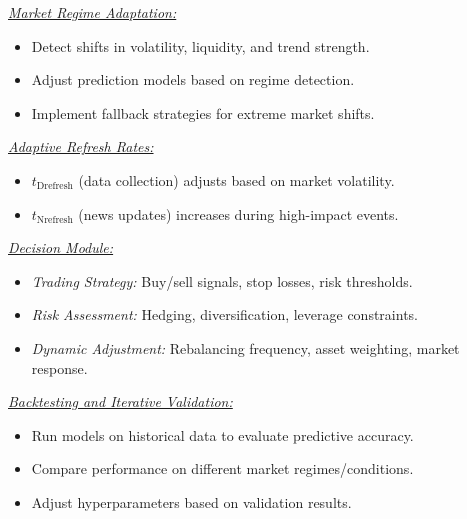 \noindent \underline{\textit{Market Regime Adaptation:}}
\begin{itemize}[leftmargin=1.5em, topsep=-.1em, parsep=-.1em, label=*]
   \item Detect shifts in volatility, liquidity, and trend strength.
   \item Adjust prediction models based on regime detection.
   \item Implement fallback strategies for extreme market shifts.
\end{itemize}

\noindent \underline{\textit{Adaptive Refresh Rates:}}
\begin{itemize}[leftmargin=1.5em, topsep=-.1em, parsep=-.1em, label=*]
   \item \(t_{\text{Drefresh}}\) (data collection) adjusts based on market volatility.
   \item \(t_{\text{Nrefresh}}\) (news updates) increases during high-impact events.
\end{itemize}

\noindent \underline{\textit{Decision Module:}}
\begin{itemize}[leftmargin=1.5em, topsep=-.1em, parsep=-.1em, label=*]
   \item \textit{Trading Strategy:} Buy/sell signals, stop losses, risk thresholds.
   \item \textit{Risk Assessment:} Hedging, diversification, leverage constraints.
   \item \textit{Dynamic Adjustment:} Rebalancing frequency, asset weighting, market response.
\end{itemize}

\noindent \underline{\textit{Backtesting and Iterative Validation:}}
\begin{itemize}[leftmargin=1.5em, topsep=-.1em, parsep=-.1em, label=*]
   \item Run models on historical data to evaluate predictive accuracy.
   \item Compare performance on different market regimes/conditions.
   \item Adjust hyperparameters based on validation results.
\end{itemize}

